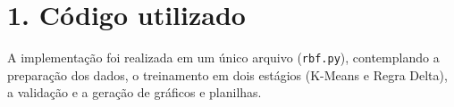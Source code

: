 \documentclass[article, 12pt, oneside, a4paper, section = TITLE, brazil]{abntex2}
\begin{document}
\pagestyle{plain}
\maketitle
\frenchspacing
{}

\clearpage

\section*{1. Código utilizado}

A implementação foi realizada em um único arquivo (\texttt{rbf.py}), contemplando a preparação dos dados, o treinamento em dois estágios (K-Means e Regra Delta), a validação e a geração de gráficos e planilhas.
\end{document}
